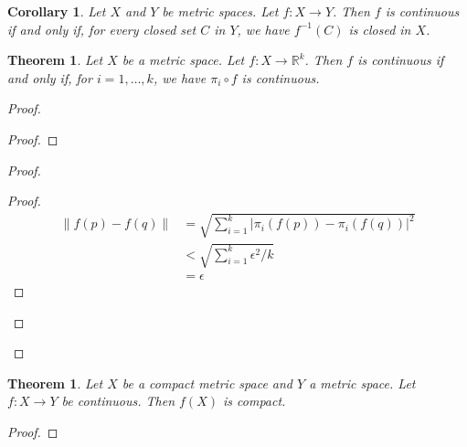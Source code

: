 \documentclass{book}
\let\qed\relax
\newtheorem{cor}{Corollary}[prop]
\newtheorem{thm}[prop]{Theorem}
\theoremstyle{definition}
\begin{document}
\begin{cor}
Let $X$ and $Y$ be metric spaces. Let $f : X \rightarrow Y$. Then $f$ is continuous if and only if, for every closed set $C$ in $Y$, we have $f^{-1}(C)$ is closed in $X$.
\end{cor}

\begin{thm}
Let $X$ be a metric space. Let $f : X \rightarrow \mathbb{R}^k$. Then $f$ is continuous if and only if, for $i = 1, \ldots, k$, we have $\pi_i \circ f$ is continuous.
\end{thm}

\begin{proof}
\pf
{}
\begin{proof}
\end{proof}
\begin{proof}
	\begin{proof}
		\pf
		\begin{align*}
			\| f(p) - f(q) \| & = \sqrt{\sum_{i=1}^k |\pi_i(f(p)) - \pi_i(f(q))|^2} \\
			& < \sqrt{\sum_{i=1}^k \epsilon^2 / k} \\
			& = \epsilon
		\end{align*}
	\end{proof}
\end{proof}
\qed
\end{proof}

\begin{thm}
Let $X$ be a compact metric space and $Y$ a metric space. Let $f : X \rightarrow Y$ be continuous. Then $f(X)$ is compact.
\end{thm}

\begin{proof}
\pf
{}
\qed
\end{proof}
\end{document}
